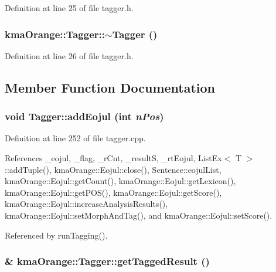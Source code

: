 Definition at line 25 of file tagger.h.\hypertarget{classkmaOrange_1_1Tagger_10916f1ba03a7906d43e9cfe6fbd096c}{
\subsubsection[{$\sim$Tagger}]{\setlength{\rightskip}{0pt plus 5cm}kmaOrange::Tagger::$\sim$Tagger ()}}
\label{classkmaOrange_1_1Tagger_10916f1ba03a7906d43e9cfe6fbd096c}




Definition at line 26 of file tagger.h.

\subsection{Member Function Documentation}
\hypertarget{classkmaOrange_1_1Tagger_88236fa94bd05f73385482d9d2f327ab}{
\subsubsection[{addEojul}]{\setlength{\rightskip}{0pt plus 5cm}void Tagger::addEojul (int {\em nPos})}}
\label{classkmaOrange_1_1Tagger_88236fa94bd05f73385482d9d2f327ab}




Definition at line 252 of file tagger.cpp.

References \_\-eojul, \_\-flag, \_\-rCnt, \_\-resultS, \_\-rtEojul, ListEx$<$ T $>$::addTuple(), kmaOrange::Eojul::close(), Sentence::eojulList, kmaOrange::Eojul::getCount(), kmaOrange::Eojul::getLexicon(), kmaOrange::Eojul::getPOS(), kmaOrange::Eojul::getScore(), kmaOrange::Eojul::increaseAnalysisResults(), kmaOrange::Eojul::setMorphAndTag(), and kmaOrange::Eojul::setScore().

Referenced by runTagging().\hypertarget{classkmaOrange_1_1Tagger_0385be36b614605b2d3715cd27bd4434}{
\subsubsection[{getTaggedResult}]{\& kmaOrange::Tagger::getTaggedResult ()}}
\label{classkmaOrange_1_1Tagger_0385be36b614605b2d3715cd27bd4434}




